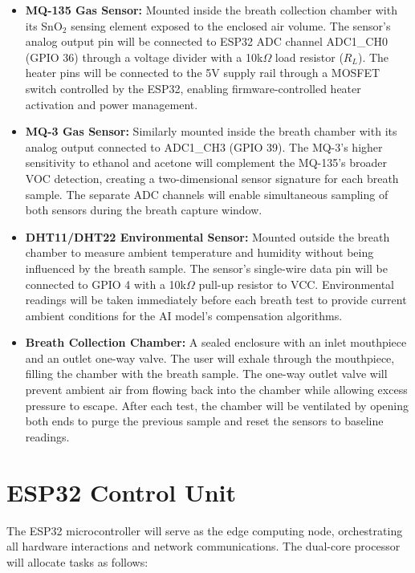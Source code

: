 \begin{itemize}[leftmargin=1.5cm]
\item \textbf{MQ-135 Gas Sensor:} Mounted inside the breath collection chamber with its SnO$_2$ sensing element exposed to the enclosed air volume. The sensor's analog output pin will be connected to ESP32 ADC channel ADC1\_CH0 (GPIO 36) through a voltage divider with a 10k$\Omega$ load resistor ($R_L$). The heater pins will be connected to the 5V supply rail through a MOSFET switch controlled by the ESP32, enabling firmware-controlled heater activation and power management.

\item \textbf{MQ-3 Gas Sensor:} Similarly mounted inside the breath chamber with its analog output connected to ADC1\_CH3 (GPIO 39). The MQ-3's higher sensitivity to ethanol and acetone will complement the MQ-135's broader VOC detection, creating a two-dimensional sensor signature for each breath sample. The separate ADC channels will enable simultaneous sampling of both sensors during the breath capture window.

\item \textbf{DHT11/DHT22 Environmental Sensor:} Mounted outside the breath chamber to measure ambient temperature and humidity without being influenced by the breath sample. The sensor's single-wire data pin will be connected to GPIO 4 with a 10k$\Omega$ pull-up resistor to VCC. Environmental readings will be taken immediately before each breath test to provide current ambient conditions for the AI model's compensation algorithms.

\item \textbf{Breath Collection Chamber:} A sealed enclosure with an inlet mouthpiece and an outlet one-way valve. The user will exhale through the mouthpiece, filling the chamber with the breath sample. The one-way outlet valve will prevent ambient air from flowing back into the chamber while allowing excess pressure to escape. After each test, the chamber will be ventilated by opening both ends to purge the previous sample and reset the sensors to baseline readings.
\end{itemize}

\section{ESP32 Control Unit}
The ESP32 microcontroller will serve as the edge computing node, orchestrating all hardware interactions and network communications. The dual-core processor will allocate tasks as follows:

